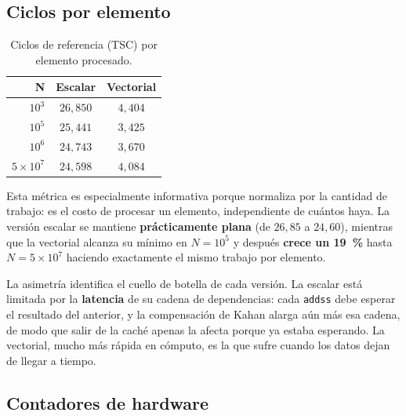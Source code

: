 \documentclass[journal]{IEEEtran}
\begin{document}
\subsection{Ciclos por elemento}

\begin{table}[ht]
\centering
\caption{Ciclos de referencia (TSC) por elemento procesado.}
\label{tab:ciclos}
\footnotesize
\begin{tabular}{|r|c|c|}
\hline
\textbf{N} & \textbf{Escalar} & \textbf{Vectorial} \\ \hline
$10^3$        & $26,850$ & $4,404$ \\ \hline
$10^5$        & $25,441$ & $3,425$ \\ \hline
$10^6$        & $24,743$ & $3,670$ \\ \hline
$5\times10^7$ & $24,598$ & $4,084$ \\ \hline
\end{tabular}
\end{table}

Esta métrica es especialmente informativa porque normaliza por la
cantidad de trabajo: es el costo de procesar un elemento, independiente de
cuántos haya. La versión escalar se mantiene \textbf{prácticamente
plana} (de $26,85$ a $24,60$), mientras que la vectorial alcanza su
mínimo en $N = 10^5$ y después \textbf{crece un \SI{19}{\percent}} hasta
$N = 5\times10^7$ haciendo exactamente el mismo trabajo por elemento.

La asimetría identifica el cuello de botella de cada versión. La
escalar está limitada por la \textbf{latencia} de su cadena de
dependencias: cada \texttt{addss} debe esperar el resultado del anterior,
y la compensación de Kahan alarga aún más esa cadena, de modo que
salir de la caché apenas la afecta porque ya estaba esperando. La
vectorial, mucho más rápida en cómputo, es la que sufre cuando los
datos dejan de llegar a tiempo.

\subsection{Contadores de hardware}
\end{document}
